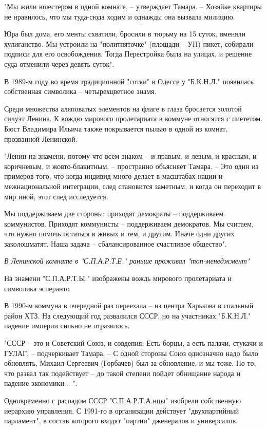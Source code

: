 "Мы жили вшестером в одной комнате, – утверждает Тамара. – Хозяйке квартиры не
нравилось, что мы туда-сюда ходим и однажды она вызвала милицию. 

Юра был дома, его менты схватили, бросили в тюрьму на 15 суток, вменяли
хулиганство. Мы устроили на "политпяточке" (площади – УП) пикет, собирали
подписи для его освобождения. Тогда Перестройка была на улицах, и решение суда
отменили через девять суток".

В 1989-м году во время традиционной "сотки" в Одессе у "Б.К.Н.Л." появилась
собственная символика – четырехцветное знамя.

Среди множества аляповатых элементов на флаге в глаза бросается золотой силуэт
Ленина. К вождю мирового пролетариата в коммуне относятся с пиететом. Бюст
Владимира Ильича также покрывается пылью в одной из комнат, прозванной
Ленинской.

"Ленин на знамени, потому что всем знаком – и правым, и левым, и красным, и
коричневым, и жовто-блакитным, – пространно объясняет Тамара. – Это один из
примеров того, что когда индивид много делает в масштабах нации и
межнациональной интеграции, след становится заметным, и когда он переходит в
мир иной, этот след исследуется. 

Мы поддерживаем две стороны: приходят демократы – поддерживаем коммунистов.
Приходят коммунисты – поддерживаем демократов. Мы считаем, что нужно помочь
остаться в живых и тем, и другим. Иначе одни других заколошматят. Наша задача –
сбалансированное счастливое общество".

{\em
В Ленинской комнате в "С.П.А.Р.Т.Е." раньше проживал "топ-менеджмент"
\/}

На знамени "С.П.А.Р.Т.Ы." изображены вождь мирового пролетариата и символика
эсперанто

В 1990-м коммуна в очередной раз переехала – из центра Харькова в спальный
район ХТЗ. На следующий год развалился СССР, но на участниках "Б.К.Н.Л."
падение империи сильно не отразилось.

"СССР – это и Советский Союз, и совдепия. Есть борцы, а есть палачи, стукачи и
ГУЛАГ, – подчеркивает Тамара. – С одной стороны Союз однозначно надо было
обновлять, Михаил Сергеевич (Горбачев) был за обновление, и мы тоже. Но то, что
развал так подействует – до такой степени пойдет обнищание народа и падение
экономики... ".

Одновременно с распадом СССР "С.П.А.Р.Т.А.нцы" изобрели собственную иерархию
управления. С 1991-го в организации действует "двухпартийный парламент", в
состав которого входят "партии" дженералов и универсалов. 

